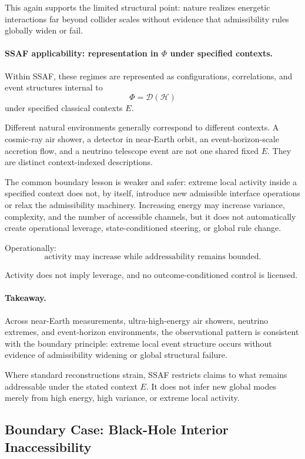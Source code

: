 \documentclass[aps,prx,onecolumn,11pt]{revtex4-2}
\theoremstyle{plain}
\theoremstyle{definition}
\theoremstyle{remark}
\begin{document}
This again supports the limited structural point: nature realizes
energetic interactions far beyond collider scales without evidence
that admissibility rules globally widen or fail.

\paragraph{SSAF applicability: representation in \texorpdfstring{\(\Phi\)}{Phi} under specified contexts.}

Within SSAF, these regimes are represented as configurations,
correlations, and event structures internal to
\[
\Phi=\mathcal D(\mathcal H)
\]
under specified classical contexts \(E\).

Different natural environments generally correspond to different
contexts. A cosmic-ray air shower, a detector in near-Earth orbit, an
event-horizon-scale accretion flow, and a neutrino telescope event are
not one shared fixed \(E\). They are distinct context-indexed
descriptions.

The common boundary lesson is weaker and safer: extreme local activity
inside a specified context does not, by itself, introduce new admissible
interface operations or relax the admissibility machinery. Increasing
energy may increase variance, complexity, and the number of accessible
channels, but it does not automatically create operational leverage,
state-conditioned steering, or global rule change.

Operationally:
\[
\text{activity may increase while addressability remains bounded}.
\]

Activity does not imply leverage, and no outcome-conditioned control is
licensed.

\paragraph{Takeaway.}

Across near-Earth measurements, ultra-high-energy air showers,
neutrino extremes, and event-horizon environments, the observational
pattern is consistent with the boundary principle: extreme local event
structure occurs without evidence of admissibility widening or global
structural failure.

Where standard reconstructions strain, SSAF restricts claims to what
remains addressable under the stated context \(E\). It does not infer
new global modes merely from high energy, high variance, or extreme
local activity.

\subsection{Boundary Case: Black-Hole Interior Inaccessibility}
\label{subsec:black_hole_inaccessibility_boundary}
\end{document}
